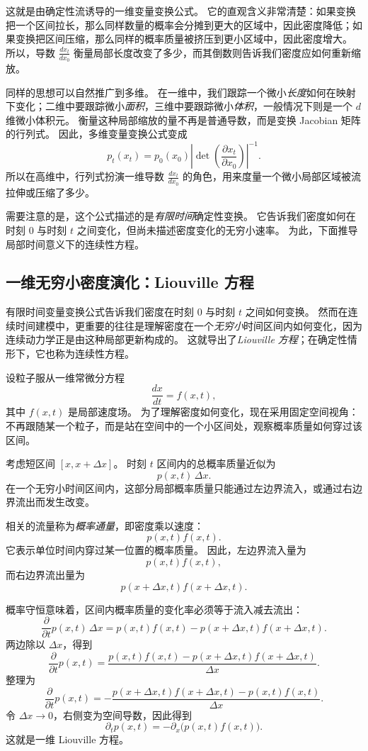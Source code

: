 这就是由确定性流诱导的一维变量变换公式。
它的直观含义非常清楚：如果变换把一个区间拉长，那么同样数量的概率会分摊到更大的区域中，因此密度降低；如果变换把区间压缩，那么同样的概率质量被挤压到更小区域中，因此密度增大。
所以，导数 $\frac{dx_t}{dx_0}$ 衡量局部长度改变了多少，而其倒数则告诉我们密度应如何重新缩放。

同样的思想可以自然推广到多维。
在一维中，我们跟踪一个微小\emph{长度}如何在映射下变化；二维中要跟踪微小\emph{面积}，三维中要跟踪微小\emph{体积}，一般情况下则是一个 $d$ 维微小体积元。
衡量这种局部缩放的量不再是普通导数，而是变换 Jacobian 矩阵的行列式。
因此，多维变量变换公式变成
\[
p_t(x_t)
=
p_0(x_0)
\left|
\det\!\left(\frac{\partial x_t}{\partial x_0}\right)
\right|^{-1}.
\]
所以在高维中，行列式扮演一维导数 $\frac{dx_t}{dx_0}$ 的角色，用来度量一个微小局部区域被流拉伸或压缩了多少。

需要注意的是，这个公式描述的是\emph{有限时间}确定性变换。
它告诉我们密度如何在时刻 $0$ 与时刻 $t$ 之间变化，但尚未描述密度变化的无穷小速率。
为此，下面推导局部时间意义下的连续性方程。

\subsection{一维无穷小密度演化：Liouville 方程}

有限时间变量变换公式告诉我们密度在时刻 $0$ 与时刻 $t$ 之间如何变换。
然而在连续时间建模中，更重要的往往是理解密度在一个\emph{无穷小}时间区间内如何变化，因为连续动力学正是由这种局部更新构成的。
这就导出了\emph{Liouville 方程}；在确定性情形下，它也称为连续性方程。

设粒子服从一维常微分方程
\[
\frac{dx}{dt}=f(x,t),
\]
其中 $f(x,t)$ 是局部速度场。
为了理解密度如何变化，现在采用固定空间视角：不再跟随某一个粒子，而是站在空间中的一个小区间处，观察概率质量如何穿过该区间。

考虑短区间 $[x,x+\Delta x]$。
时刻 $t$ 区间内的总概率质量近似为
\[
p(x,t)\,\Delta x.
\]
在一个无穷小时间区间内，这部分局部概率质量只能通过左边界流入，或通过右边界流出而发生改变。

相关的流量称为\emph{概率通量}，即密度乘以速度：
\[
p(x,t)f(x,t).
\]
它表示单位时间内穿过某一位置的概率质量。
因此，左边界流入量为
\[
p(x,t)f(x,t),
\]
而右边界流出量为
\[
p(x+\Delta x,t)f(x+\Delta x,t).
\]

概率守恒意味着，区间内概率质量的变化率必须等于流入减去流出：
\[
\frac{\partial}{\partial t}p(x,t)\,\Delta x
=
p(x,t)f(x,t)-p(x+\Delta x,t)f(x+\Delta x,t).
\]
两边除以 $\Delta x$，得到
\[
\frac{\partial}{\partial t}p(x,t)
=
\frac{p(x,t)f(x,t)-p(x+\Delta x,t)f(x+\Delta x,t)}{\Delta x}.
\]
整理为
\[
\frac{\partial}{\partial t}p(x,t)
=
-
\frac{p(x+\Delta x,t)f(x+\Delta x,t)-p(x,t)f(x,t)}{\Delta x}.
\]
令 $\Delta x\to 0$，右侧变为空间导数，因此得到
\[
\boxed{
\partial_t p(x,t)
=
-\partial_x\bigl(p(x,t)f(x,t)\bigr).
}
\]
这就是一维 Liouville 方程。

